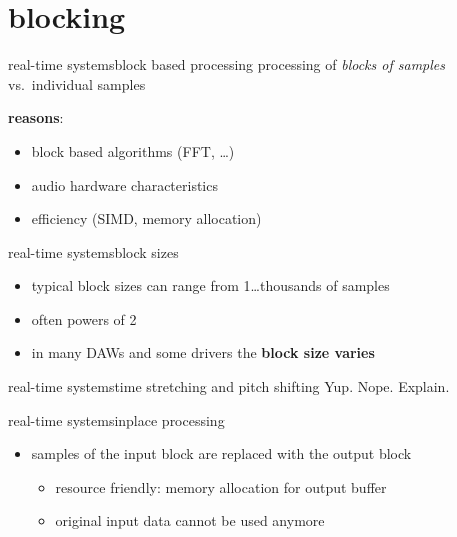     \section{blocking}
	\begin{frame}{real-time systems}{block based processing}
		processing of \textit{blocks of samples} vs.\ individual samples
		
		\begin{figure}
			\centering
			
		\end{figure}
		\pause
		\vspace{-5mm}
		\textbf{reasons}:
		\begin{itemize}
			\item	block based algorithms (FFT, \ldots)
			\item	audio hardware characteristics
			\item	efficiency (SIMD, memory allocation)
		\end{itemize}
	\end{frame}
    \begin{frame}{real-time systems}{block sizes}
        \begin{itemize}
            \item   typical block sizes can range from 1\ldots thousands of samples
            \item   often powers of 2
            \bigskip
            \item<2->   in many DAWs and some drivers the \textbf{block size varies}
        \end{itemize}
    \end{frame}
    \begin{frame}{real-time systems}{time stretching and pitch shifting}
        \bigskip
        Yup.
        \bigskip
        \bigskip
        Nope. Explain.
    \end{frame}
    \begin{frame}{real-time systems}{inplace processing}
        
        \bigskip
        
        \begin{itemize}
            \item   samples of the input block are replaced with the output block
                \begin{itemize}
                    \item<3->[$+$]  resource friendly: memory allocation for output buffer
                    \item<3->[--]  original input data cannot be used anymore
                \end{itemize}
        \end{itemize}
    \end{frame}

